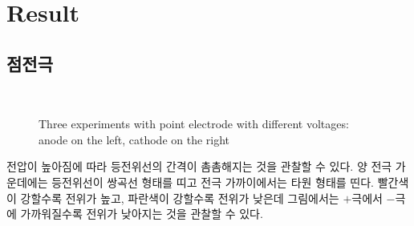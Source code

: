 \documentclass[a4paper]{article}
\begin{document}
\newpage

\section{Result}
	\subsection{점전극}

		\begin{figure}[h]
				\centering
				\quad
				\\
			\caption{Three experiments with point electrode with different voltages: anode on the left, cathode on the right}
		\end{figure}	

		전압이 높아짐에 따라 등전위선의 간격이 촘촘해지는 것을 관찰할 수 있다. 양 전극 가운데에는 등전위선이 쌍곡선 형태를 띠고 전극 가까이에서는 타원 형태를 띤다. 빨간색이 강할수록 전위가 높고, 파란색이 강할수록 전위가 낮은데 그림에서는 $+$극에서 $-$극에 가까워질수록 전위가 낮아지는 것을 관찰할 수 있다.   
\end{document}
